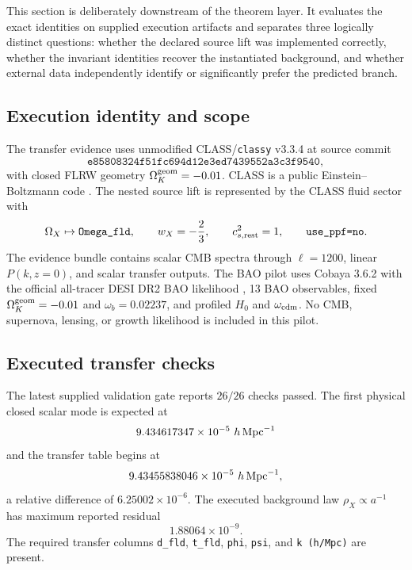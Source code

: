 \documentclass[aps,prd,reprint,onecolumn,nofootinbib,superscriptaddress,showkeys]{revtex4-2}
\numberwithin{equation}{section}
\theoremstyle{definition}
\theoremstyle{plain}
\begin{document}
This section is deliberately downstream of the theorem layer.  It evaluates the exact identities on supplied execution artifacts and separates three logically distinct questions: whether the declared source lift was implemented correctly, whether the invariant identities recover the instantiated background, and whether external data independently identify or significantly prefer the predicted branch.

\subsection{Execution identity and scope}

The transfer evidence uses unmodified CLASS/\texttt{classy} v3.3.4 at source commit
\begin{equation}
\texttt{e85808324f51fc694d12e3ed7439552a3c3f9540},
\end{equation}
with closed FLRW geometry \(\Omega_K^{\rm geom}=-0.01\).  CLASS is a public Einstein--Boltzmann code \cite{Lesgourgues2011CLASS,BlasLesgourguesTram2011}.  The nested source lift is represented by the CLASS fluid sector with
\begin{equation}
\Omega_X\mapsto\texttt{Omega\_fld},
\qquad
w_X=-\frac23,
\qquad
c_{s,{\rm rest}}^2=1,
\qquad
\texttt{use\_ppf=no}.
\end{equation}
The evidence bundle contains scalar CMB spectra through \(\ell=1200\), linear \(P(k,z=0)\), and scalar transfer outputs.  The BAO pilot uses Cobaya 3.6.2 \cite{TorradoLewis2021} with the official all-tracer DESI DR2 BAO likelihood \cite{DESIDR2BAO2025}, 13 BAO observables, fixed \(\Omega_K^{\rm geom}=-0.01\) and \(\omega_b=0.02237\), and profiled \(H_0\) and \(\omega_{\rm cdm}\).  No CMB, supernova, lensing, or growth likelihood is included in this pilot.

\subsection{Executed transfer checks}

The latest supplied validation gate reports \(26/26\) checks passed.  The first physical closed scalar mode is expected at
\begin{equation}
9.434617347\times10^{-5}\ h\,{\rm Mpc}^{-1}
\end{equation}
and the transfer table begins at
\begin{equation}
9.43455838046\times10^{-5}\ h\,{\rm Mpc}^{-1},
\end{equation}
a relative difference of \(6.25002\times10^{-6}\).  The executed background law \(\rho_X\propto a^{-1}\) has maximum reported residual
\begin{equation}
\boxed{1.88064\times10^{-9}}.
\end{equation}
The required transfer columns \texttt{d\_fld}, \texttt{t\_fld}, \texttt{phi}, \texttt{psi}, and \texttt{k (h/Mpc)} are present.
\end{document}

